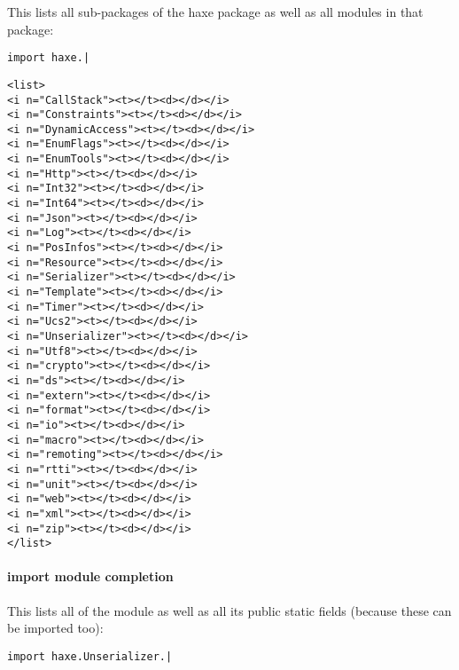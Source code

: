 This lists all sub-packages of the haxe package as well as all modules in that package:

\begin{lstlisting}
import haxe.|
\end{lstlisting}

\begin{lstlisting}
<list>
<i n="CallStack"><t></t><d></d></i>
<i n="Constraints"><t></t><d></d></i>
<i n="DynamicAccess"><t></t><d></d></i>
<i n="EnumFlags"><t></t><d></d></i>
<i n="EnumTools"><t></t><d></d></i>
<i n="Http"><t></t><d></d></i>
<i n="Int32"><t></t><d></d></i>
<i n="Int64"><t></t><d></d></i>
<i n="Json"><t></t><d></d></i>
<i n="Log"><t></t><d></d></i>
<i n="PosInfos"><t></t><d></d></i>
<i n="Resource"><t></t><d></d></i>
<i n="Serializer"><t></t><d></d></i>
<i n="Template"><t></t><d></d></i>
<i n="Timer"><t></t><d></d></i>
<i n="Ucs2"><t></t><d></d></i>
<i n="Unserializer"><t></t><d></d></i>
<i n="Utf8"><t></t><d></d></i>
<i n="crypto"><t></t><d></d></i>
<i n="ds"><t></t><d></d></i>
<i n="extern"><t></t><d></d></i>
<i n="format"><t></t><d></d></i>
<i n="io"><t></t><d></d></i>
<i n="macro"><t></t><d></d></i>
<i n="remoting"><t></t><d></d></i>
<i n="rtti"><t></t><d></d></i>
<i n="unit"><t></t><d></d></i>
<i n="web"><t></t><d></d></i>
<i n="xml"><t></t><d></d></i>
<i n="zip"><t></t><d></d></i>
</list>
\end{lstlisting}


\paragraph{import module completion}

This lists all  of the module  as well as all its public static fields (because these can be imported too):

\begin{lstlisting}
import haxe.Unserializer.|
\end{lstlisting}

